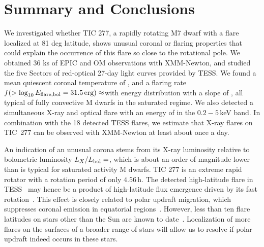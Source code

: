 \documentclass[twocolumn]{aastex631}
\begin{document}
\section{Summary and Conclusions}
\label{sec:summary}
We investigated whether TIC 277, a rapidly rotating M7 dwarf with a flare localized at 81 deg latitude, shows unusual coronal or flaring properties that could explain the occurrence of this flare so close to the rotational pole. We obtained 36 ks of EPIC and OM observations with XMM-Newton, and studied the five Sectors of red-optical 27-day light curves provided by TESS. We found a mean quiescent coronal temperature of \Tqmean, and a flaring rate $f(> \log_{10} E_{\rm flare, bol} = 31.5\,\rm{erg})\approx$\ffdr with energy distribution with a slope of \ffdalpha, all typical of fully convective M dwarfs in the saturated regime. We also detected a simultaneous X-ray and optical flare with an energy of \eepic in the $0.2-5\,$keV band. In combination with the 18 detected TESS flares, we estimate that X-ray flares on TIC~277 can be observed with XMM-Newton at least about once a day. %

An indication of an unusual corona stems from its X-ray luminosity relative to bolometric luminosity $L_X/L_{\rm bol}=$\LXLbol, which is about an order of magnitude lower than is typical for saturated activity M dwarfs. TIC 277 is an extreme rapid rotator with a rotation period of only $4.56\,$h. The detected high-latitude flare in TESS~\citep{ilin2021giant} may hence be a product of high-latitude flux emergence driven by its fast rotation~\citep{weber2016modeling,weber2017suppression}. This effect is closely related to polar updraft migration, which suppresses coronal emission in equatorial regions~\citep{stepien2001rosat}. However, less than ten flare latitudes on stars other than the Sun are known to date~\citep{wolter2008doppler, ilin2021giant, johnson2021simultaneous}. Localization of more flares on the surfaces of a broader range of stars will allow us to resolve if polar updraft indeed occurs in these stars.

\end{document}
